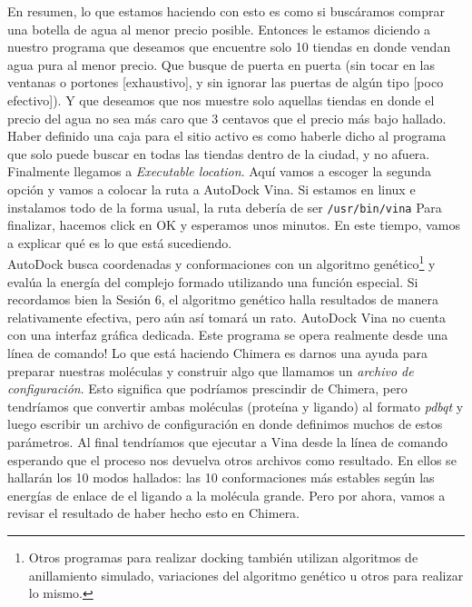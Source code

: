 \documentclass[10pt,letterpaper]{article}
\newcommand{\inlinecode}[1]{
\colorbox{light-gray}{\texttt{#1}}
}
\begin{document}
En resumen, lo que estamos haciendo con esto es como si busc\'aramos comprar una botella de agua al menor precio posible. Entonces le estamos diciendo a nuestro programa que deseamos que encuentre solo 10 tiendas en donde vendan agua pura al menor precio. Que busque de puerta en puerta (sin tocar en las ventanas o portones [exhaustivo], y sin ignorar las puertas de alg\'un tipo [poco efectivo]). Y que deseamos que nos muestre solo aquellas tiendas en donde el precio del agua no sea m\'as caro que 3 centavos que el precio m\'as bajo hallado. Haber definido una caja para el sitio activo es como haberle dicho al programa que solo puede buscar en todas las tiendas dentro de la ciudad, y no afuera.\\

Finalmente llegamos a \emph{Executable location}. Aqu\'i vamos a escoger la segunda opci\'on y vamos a colocar la ruta a AutoDock Vina. Si estamos en linux e instalamos todo de la forma usual, la ruta deber\'ia de ser \inlinecode{/usr/bin/vina} Para finalizar, hacemos click en OK y esperamos unos minutos. En este tiempo, vamos a explicar qu\'e es lo que est\'a sucediendo.\\

AutoDock busca coordenadas y conformaciones con un algoritmo gen\'etico\footnote{Otros programas para realizar docking tambi\'en utilizan algoritmos de anillamiento simulado, variaciones del algoritmo gen\'etico u otros para realizar lo mismo.} y eval\'ua la energ\'ia del complejo formado utilizando una funci\'on especial. Si recordamos bien la Sesi\'on 6, el algoritmo gen\'etico halla resultados de manera relativamente efectiva, pero a\'un as\'i tomar\'a un rato. AutoDock Vina no cuenta con una interfaz gr\'afica dedicada. Este programa se opera realmente desde una l\'inea de comando! Lo que est\'a haciendo Chimera es darnos una ayuda para preparar nuestras mol\'eculas y construir algo que llamamos un \emph{archivo de configuraci\'on}. Esto significa que podr\'iamos prescindir de Chimera, pero tendr\'iamos que convertir ambas mol\'eculas (prote\'ina y ligando) al formato \emph{pdbqt} y luego escribir un archivo de configuraci\'on en donde definimos muchos de estos par\'ametros. Al final tendr\'iamos que ejecutar a Vina desde la l\'inea de comando esperando que el proceso nos devuelva otros archivos como resultado. En ellos se hallar\'an los 10 modos hallados: las 10 conformaciones m\'as estables seg\'un las energ\'ias de enlace de el ligando a la mol\'ecula grande. Pero por ahora, vamos a revisar el resultado de haber hecho esto en Chimera.\\
\end{document}
